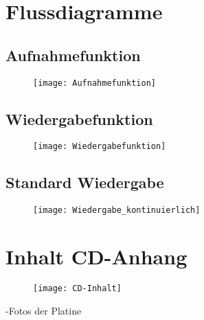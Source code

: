 
\newpage
\appendix
\section{Flussdiagramme}
\subsection{Aufnahmefunktion}
\label{fluss:recf}
\begin{figure}[h]
	\begin{center}
		\texttt{[image: Aufnahmefunktion]}
	\end{center}
\end{figure}
\newpage
\subsection{Wiedergabefunktion}
\label{fluss:playf}
\begin{figure}[h]
	\begin{center}
		\texttt{[image: Wiedergabefunktion]}
	\end{center}
\end{figure}
\newpage
\subsection{Standard Wiedergabe}
\label{fluss:playconti}
\begin{figure}[h]
	\begin{center}
		\texttt{[image: Wiedergabe\_kontinuierlich]}
	\end{center}
\end{figure}
\newpage
\section{Inhalt CD-Anhang}
\label{CD-Anhang}
\begin{figure}[h]
	\texttt{[image: CD-Inhalt]}
\end{figure}
-Fotos der Platine